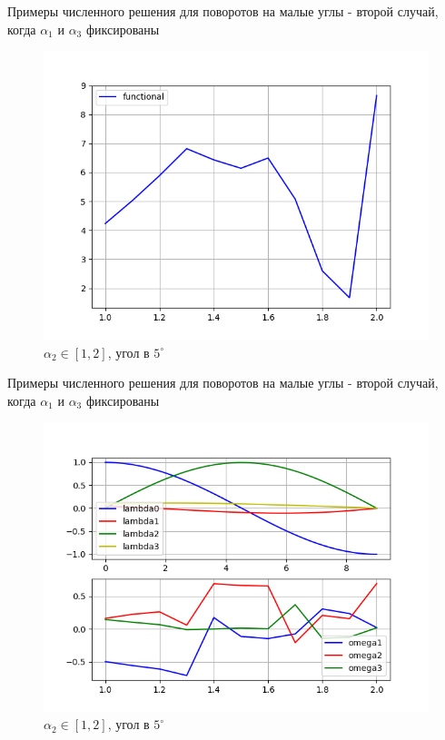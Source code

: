 \documentclass[10pt,utf8,presentation,notheorems,xcolor=dvipsnames,compress]{beamer}
\begin{document}
\begin{frame}{Примеры численного решения для поворотов на малые углы - второй случай, когда $\alpha_1$ и $\alpha_3$ фиксированы}
\begin{figure}[H]
\center\includegraphics[scale=0.5]{fig/functional_alpha2_1-2_5.png}
\caption{$\alpha_2 \in [1, 2]$, угол в $5^{\circ}$}
\end{figure}
\end{frame}

\begin{frame}{Примеры численного решения для поворотов на малые углы - второй случай, когда $\alpha_1$ и $\alpha_3$ фиксированы}
\begin{figure}[H]
\center\includegraphics[scale=0.5]{fig/ivp_and_control_alpha2_1-2_5.png}
\caption{$\alpha_2 \in [1, 2]$, угол в $5^{\circ}$}
\end{figure}
\end{frame}
\end{document}
